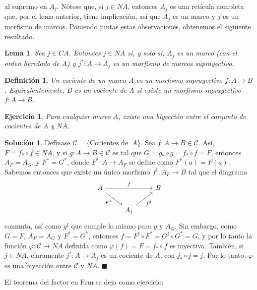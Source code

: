 \documentclass[12pt,letterpaper,titlepage]{article}
\newcommand{\xqed}[1]{%
  \leavevmode\unskip\penalty9999 \hbox{}\nobreak\hfill
  \quad\hbox{\ensuremath{#1}}}
\newtheorem*{defn}{Definición}
\newtheorem{exe}{Ejercicio}
\newtheorem{lemma}{Lema}
\theoremstyle{definition}
\newtheorem*{soltemp}{Solución}
\newenvironment{sol}[1]{%
    \begin{soltemp}#1}{%
    \xqed{\blacksquare}\end{soltemp}%
}
\renewcommand\phi{\varphi}
\newcommand\<{\langle}
\renewcommand\>{\rangle}
\newcommand{\Frm}{\mathrm{Frm}}
\begin{document}
al supremo en $A_j$.
Nótese que, si $j\in NA$, entonces $A_j$ es una retícula completa que,
por el lema anterior, tiene implicación, así que $A_j$ es un marco
y $j$ es un morfismo de marcos.
Poniendo juntas estas observaciones, obtenemos el siguiente resultado.
\begin{lemma}
    Sea $j\in CA$.
    Entonces $j\in NA$ si, y solo si,
    $A_j$ es un marco (con el orden heredado de $A$)
    y $j^*:A\to A_j$ es un morfismo de marcos suprayectivo.
\end{lemma}
\begin{defn}
  Un cociente de un marco $A$ es un morfismo suprayectivo $f:A\to B$.
  Equivalentemente, $B$ es un cociente de $A$ si existe un
  morfismo suprayectivo $f:A\to B$.
\end{defn}

\begin{exe}%
Para cualquier marco $A$, existe una biyección entre el conjunto de cocientes de $A$ y $NA$.
\end{exe}
\begin{sol}
    Defínase $\mathcal{C}=\{\text{Cocientes de } \ A\}$. Sea $f:A\to B\in \mathcal{C}$. Así, $F=f_*\circ f\in NA$, y si $g:A\to B\in\mathcal{C}$ es tal que $G=g_*\circ g=f_*\circ f=F$, entonces $A_F=A_G$, y $F^*=G^*$, donde $F^*:A\to A_F$ se define como $F^*(a)=F(a)$. Sabemos entonces que existe un único morfismo $f^\sharp:A_F\to B$ tal que el diagrama
    \[
        \begin{tikzcd}
            A \ar[rr,"f"] \ar[dr,"F^*"'] &&  B \\
            &A_j \ar[ur,"f^\sharp"']
        \end{tikzcd}
    \]
    conmuta, así como $g^\sharp$ que cumple lo mismo para $g$ y $A_G$. Sin embargo, como $G=F$, $A_F=A_G$ y $F^*=G^*$, entonces $f=F^\sharp\circ F^*=G^\sharp\circ G^*=G$, y por lo tanto la función $\phi:\mathcal{C}\to NA$ definida como $\phi(f)=F=f_*\circ f$ es inyectiva. También, si $j\in NA$, claramente $j^*:A\to A_j$ es un cociente de $A$, con $j_*\circ j =j$. Por lo tanto, $\phi$ es una biyección entre $\mathcal{C}$ y $NA$.
\end{sol}

El teorema del factor en $\Frm$ se deja como ejercicio:
\end{document}
